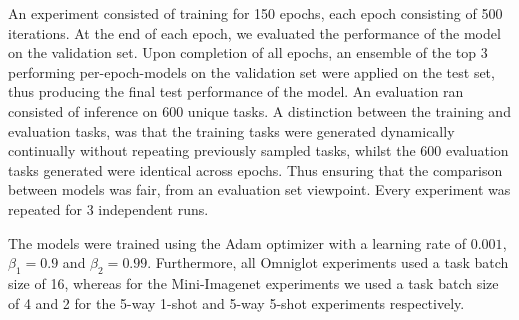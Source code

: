 \documentclass{article} \usepackage[dvipsnames]{xcolor}
\begin{document}
An experiment consisted of training for 150 epochs, each epoch consisting of 500 iterations. At the end of each epoch, we evaluated the performance of the model on the validation set. Upon completion of all epochs, an ensemble of the top 3 performing per-epoch-models on the validation set were applied on the test set, thus producing the final test performance of the model. An evaluation ran consisted of inference on 600 unique tasks. A distinction between the training and evaluation tasks, was that the training tasks were generated dynamically continually without repeating previously sampled tasks, whilst the 600 evaluation tasks generated were identical across epochs. Thus ensuring that the comparison between models was fair, from an evaluation set viewpoint. Every experiment was repeated for 3 independent runs.

The models were trained using the Adam optimizer with a learning rate of $0.001$, $\beta_{1} = 0.9$ and $\beta_{2} = 0.99$. Furthermore, all Omniglot experiments used a task batch size of 16, whereas for the Mini-Imagenet experiments we used a task batch size of 4 and 2 for the 5-way 1-shot and 5-way 5-shot experiments respectively.
\end{document}

